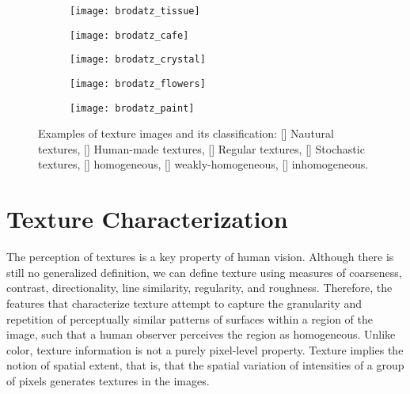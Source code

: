 \begin{figure}[!ht]
    \begin{subfigure}[b]{0.19\textwidth}
        \texttt{[image: brodatz\_tissue]}
        \caption{}
    \end{subfigure}
    \begin{subfigure}[b]{0.19\textwidth}
        \texttt{[image: brodatz\_cafe]}
        \caption{}
    \end{subfigure} 
    \begin{subfigure}[b]{0.19\textwidth}
        \texttt{[image: brodatz\_crystal]}
        \caption{}
    \end{subfigure}
    \begin{subfigure}[b]{0.19\textwidth}
        \texttt{[image: brodatz\_flowers]}
        \caption{}
    \end{subfigure}
    \begin{subfigure}[b]{0.19\textwidth}
        \texttt{[image: brodatz\_paint]}
        \caption{}
    \end{subfigure}    
                  
    \caption{Examples of texture images and its classification: [] Nautural textures, [] Human-made textures, [] Regular textures, [] Stochastic textures, [] homogeneous, [] weakly-homogeneous, [] inhomogeneous.}\label{fig:texture_images}    
\end{figure}


\section{Texture Characterization}
The perception of textures is a key property of human vision. Although there is still no generalized definition, we can define texture using measures of coarseness, contrast, directionality, line similarity, regularity, and roughness. Therefore, the features that characterize texture attempt to capture the granularity and repetition of perceptually similar patterns of surfaces within a region of the image, such that a human observer perceives the region as homogeneous. Unlike color, texture information is not a purely pixel-level property. Texture implies the notion of spatial extent, that is, that the spatial variation of intensities of a group of pixels generates textures in the images.

